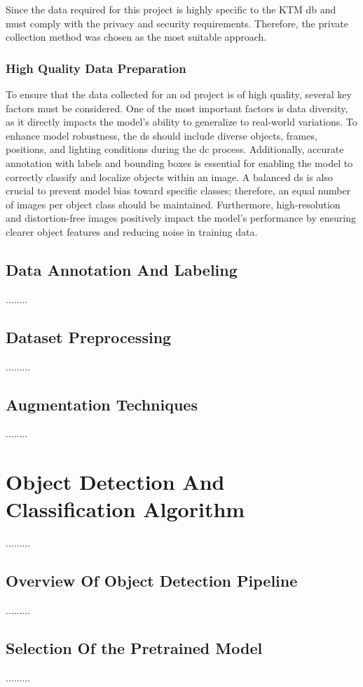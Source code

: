 Since the data required for this project is highly specific to the KTM \gls{db} and must comply with the privacy and security requirements. Therefore, the private collection method was chosen as the most suitable approach.

\subsubsection{High Quality Data Preparation}
To ensure that the data collected for an \gls{od} project is of high quality, several key factors must be considered. One of the most important factors is data diversity, as it directly impacts the model’s ability to generalize to real-world variations. To enhance model robustness, the \gls{ds} should include diverse objects, frames, positions, and lighting conditions during the \gls{dc} process. Additionally, accurate annotation with labels and bounding boxes is essential for enabling the model to correctly classify and localize objects within an image. A balanced \gls{ds} is also crucial to prevent model bias toward specific classes; therefore, an equal number of images per object class should be maintained. Furthermore, high-resolution and distortion-free images positively impact the model’s performance by ensuring clearer object features and reducing noise in training data.



\subsection{Data Annotation And Labeling}
........
\subsection{Dataset Preprocessing}
.........
\subsection{Augmentation Techniques}
........

\section{Object Detection And Classification Algorithm}
.........
\subsection{Overview Of Object Detection Pipeline}
.........
\subsection{Selection Of the Pretrained Model}
.........
